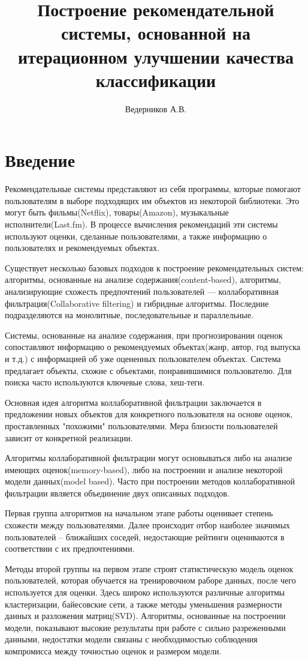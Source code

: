 \documentclass[12pt]{article} %
\title{Построение рекомендательной системы, основанной на итерационном улучшении качества классификации}
\author{Ведерников А.В.}
\begin{document}
\maketitle


\section{Введение}
\par Рекомендательные системы представляют из себя программы, которые помогают пользователям в выборе подходящих им объектов из некоторой библиотеки.  %
Это могут быть фильмы(Netflix), товары(Amazon), музыкальные исполнители(Last.fm). В процессе вычисления рекомендаций эти системы используют оценки, сделанные пользователями, а также информацию о пользователях и рекомендуемых объектах.


\par
Существует несколько базовых подходов к построение рекомендательных систем: алгоритмы, основанные на анализе содержания(content-based), алгоритмы, анализирующие схожесть предпочтений пользователей --- коллаборативная фильтрация(Collaborative filtering) и гибридные алгоритмы. Последние подразделяются на монолитные, последовательные и параллельные.
\par
Системы, основанные на анализе содержания, при прогнозировании оценок сопоставляют информацию о рекомендуемых объектах(жанр, автор, год выпуска и т.д.) с информацией об уже оцененных пользователем объектах. Система предлагает объекты, схожие с объектами, понравившимися пользователю. Для поиска часто используются ключевые слова, хеш-теги. 
\par
Основная идея алгоритма коллаборативной фильтрации заключается в предложении новых объектов для конкретного пользователя на основе оценок, проставленных "похожими" пользователями. Мера близости пользователей зависит от конкретной реализации.
\par
Алгоритмы коллаборативной фильтрации могут основываться либо на анализе имеющих оценок(memory-based), либо на построении и анализе некоторой модели данных(model based). Часто при построении методов коллаборативной фильтрации является объединение двух описанных подходов.
\par
Первая группа алгоритмов на начальном этапе работы оценивает степень схожести между пользователями. Далее происходит отбор наиболее значимых пользователей -- ближайших соседей, недостающие рейтинги оцениваются в соответствии с их предпочтениями.
\par
Методы второй группы на первом этапе строят статистическую модель оценок пользователей, которая обучается на тренировочном раборе данных, после чего используется для оценки. Здесь широко используются различные алгоритмы кластеризации, байесовские сети, а также методы уменьшения размерности данных и разложения матриц(SVD). Алгоритмы, основанные на построении  модели, показывают высокие результаты при работе с сильно разреженными данными, недостатки модели связаны с необходимостью соблюдения компромисса между точностью оценок и размером модели.
\end{document}

